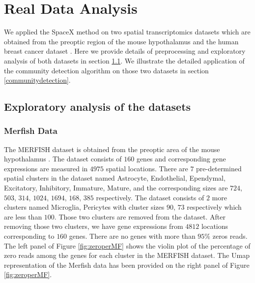 \documentclass[
]{book}
\begin{document}
\hypertarget{realdata}{%
\chapter{Real Data Analysis}\label{realdata}}

We applied the SpaceX method on two spatial transcriptomics datasets which are obtained from the preoptic region of the mouse hypothalamus \citep{Moffitteaau5324} and the human breast cancer dataset \citep{staahl2016visualization}. Here we provide details of preprocessing and exploratory analysis of both datasets in section \ref{exploratory}. We illustrate the detailed application of the community detection algorithm on those two datasets in section \ref{communitydetection}.

\hypertarget{exploratory}{%
\section{Exploratory analysis of the datasets}\label{exploratory}}

\hypertarget{merfish-data}{%
\subsection{Merfish Data}\label{merfish-data}}

The MERFISH dataset is obtained from the preoptic area of the mouse hypothalamus \citep{Moffitteaau5324}. The dataset consists of \(160\) genes and corresponding gene expressions are measured in \(4975\) spatial locations. There are \(7\) pre-determined spatial clusters in the dataset named Astrocyte, Endothelial, Ependymal, Excitatory, Inhibitory, Immature, Mature, and the corresponding sizes are \(724\), \(503\), \(314\), \(1024\), \(1694\), \(168\), \(385\) respectively. The dataset consists of \(2\) more clusters named Microglia, Pericytes with cluster sizes \(90\), \(73\) respectively which are less than \(100\). Those two clusters are removed from the dataset. After removing those two clusters, we have gene expressions from \(4812\) locations corresponding to \(160\) genes. There are no genes with more than \(95\%\) zeros reads. The left panel of Figure \ref{fig:zeroperMF} shows the violin plot of the percentage of zero reads among the genes for each cluster in the MERFISH dataset. The Umap representation of the Merfish data has been provided on the right panel of Figure \ref{fig:zeroperMF}.
\end{document}
